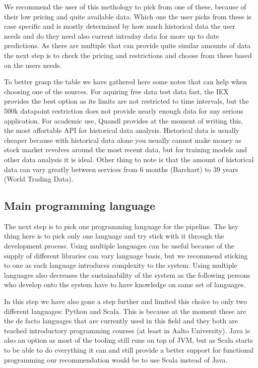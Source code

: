 We recommend the user of this methology to pick from one of these, because of their low pricing and quite available data.
Which one the user picks from these is case specific and is mostly determined by how much historical data the user needs and do they need also current intraday data for more up to date predictions.
As there are multiple that can provide quite similar amounts of data the next step is to check the pricing and restrictions and choose from these based on the users needs.

To better grasp the table we have gathered here some notes that can help when choosing one of the sources.
For aquiring free data test data fast, the IEX provides the best option as its limits are not restricted to time intervals, but the 500k datapoint restriction does not provide nearly enough data for any serious application.
For academic use, Quandl provides at the moment of writing this, the most affortable API for historical data analysis.
Historical data is usually cheaper because with historical data alone you usually cannot make money as stock market revolves around the most recent data, but for training models and other data analysis it is ideal.
Other thing to note is that the amount of historical data can vary greatly between services from 6 months (Barchart) to 39 years (World Trading Data).

\subsection{Main programming language}

The next step is to pick one programming language for the pipeline.
The key thing here is to pick only one language and try stick with it through the development process.
Using multiple languages can be useful because of the supply of different libraries can vary language basis, but we recommend sticking to one as each language introduces complexity to the system.
Using multiple languages also decreases the sustainability of the system as the following persons who develop onto the system have to have knowledge on same set of languages.

In this step we have also gone a step further and limited this choice to only two different languages: Python and Scala.
This is because at the moment these are the de facto languages that are currently used in this field and they both are teached introductory programming courses (at least in Aalto University).
Java is also an option as most of the tooling still runs on top of JVM, but as Scala starts to be able to do everything it can and still provide a better support for functional programming our recommendation would be to use Scala instead of Java.


